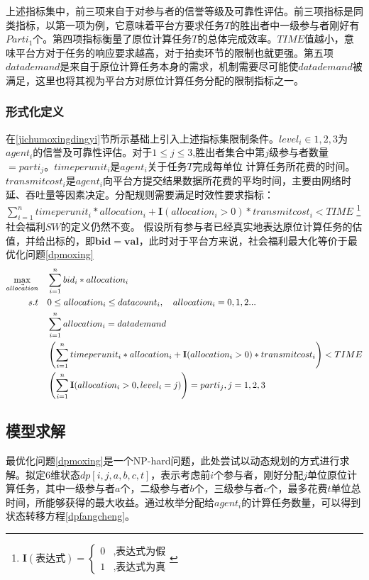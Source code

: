 \documentclass[promaster]{thesis-uestc}
\begin{document}
上述指标集中，前三项来自于对参与者的信誉等级及可靠性评估。前三项指标是同类指标，以第一项为例，它意味着平台方要求任务$T$的胜出者中一级参与者刚好有$Parti_1$个。第四项指标衡量了原位计算任务$T$的总体完成效率。$TIME$值越小，意味平台方对于任务的响应要求越高，对于拍卖环节的限制也就更强。第五项$datademand$是来自于原位计算任务本身的需求，机制需要尽可能使$datademand$被满足，这里也将其视为平台方对原位计算任务分配的限制指标之一。
\subsubsection{形式化定义}
\label{dpdingyi}
在\ref{jichumoxingdingyi}节所示基础上引入上述指标集限制条件。$level_i\in {1,2,3}$为$agent_i$的信誉及可靠性评估。对于$1\leq j \leq 3$,胜出者集合中第$j$级参与者数量$=parti_j$。$timeperunit_i$是$agent_i$关于$任务T$完成每单位
计算任务所花费的时间。$transmitcost_i$是$agent_i$向平台方提交结果数据所花费的平均时间，主要由网络时延、吞吐量等因素决定。分配规则需要满足时效性要求指标：$\sum_{i=1}^{n}{timeperunit_i*allocation_i+\mathbf{I}(allocation_i > 0)*transmitcost_i} < TIME$
\footnote{$\mathbf{I}(\text{表达式}) = \begin{cases}{}
        0&,\text{表达式为假}\\
        1&,\text{表达式为真}
        \end{cases}$
}%
社会福利$SW$的定义仍然不变。
假设所有参与者已经真实地表达原位计算任务的估值，并给出标的，即$\mathbf{bid} = \mathbf{val}$，此时对于平台方来说，社会福利最大化等价于最优化问题\ref{dpmoxing}
\begin{align}
    \label{dpmoxing}\max_{\vec{allocation}} \quad&\sum_{i=1}^{n}{bid_i*allocation_i}\\
    s.t\quad& 0\leq allocation_i\leq datacount_i,\quad allocation_i = {0,1,2...}\notag\\
        \quad& \sum_{i=1}^{n}{allocation_i} = datademand\notag\\
        \quad& \left(\sum_{i=1}^{n}{timeperunit_i*allocation_i+\mathbf{I}(allocation_i > 0)*transmitcost_i}\right) < TIME\notag\\
        \quad& \left(\sum_{i=1}^{n}{\mathbf{I}(allocation_i > 0,level_i = j)}\right)=parti_j, j = {1,2,3}\notag
\end{align}

\subsection{模型求解}
最优化问题\ref{dpmoxing}是一个NP-hard问题，此处尝试以动态规划的方式进行求解。拟定6维状态$dp[i,j,a,b,c,t]$，表示考虑前$i$个参与者，刚好分配$j$单位原位计算任务，其中一级参与者$a$个，二级参与者$b$个，三级参与者$c$个，最多花费$t$单位总时间，所能够获得的最大收益。通过枚举分配给$agent_i$的计算任务数量，可以得到状态转移方程\ref{dpfangcheng}。
\end{document}
